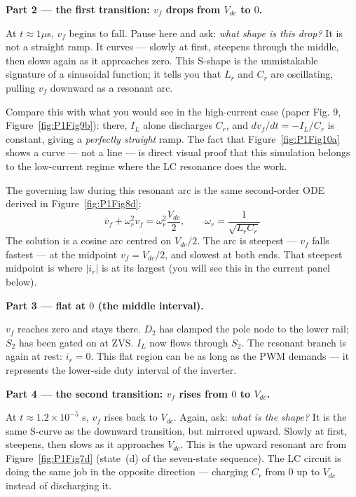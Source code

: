 \documentclass[12pt, a4paper]{article}
\def\,{ }%
\newcommand{\Vdc}{V_{dc}}
\newcommand{\vf}{v_f}
\newcommand{\ir}{i_r}
\newcommand{\IL}{I_L}
\newcommand{\Lr}{L_r}
\newcommand{\Cr}{C_r}
\newcommand{\omegar}{\omega_r}
\newcommand{\figref}[1]{Figure~\ref{#1}}
\begin{document}
\medskip
\textbf{Part 2 --- the first transition: $\vf$ drops from $\Vdc$ to $0$.}

At $t \approx 1\,\mu$s, $\vf$ begins to fall.
Pause here and ask: \emph{what shape is this drop?}
It is not a straight ramp.
It curves --- slowly at first, steepens through the middle, then slows again
as it approaches zero.
This S-shape is the unmistakable signature of a sinusoidal function; it
tells you that $\Lr$ and $\Cr$ are oscillating, pulling $\vf$ downward
as a resonant arc.

Compare this with what you would see in the high-current case (paper
Fig.\,9, \figref{fig:P1Fig9b}): there, $I_L$ alone discharges $C_r$, and
$d\vf/dt = -\IL/C_r$ is constant, giving a \emph{perfectly straight} ramp.
The fact that \figref{fig:P1Fig10a} shows a curve --- not a line --- is
direct visual proof that this simulation belongs to the low-current regime
where the LC resonance does the work.

The governing law during this resonant arc is the same second-order ODE
derived in \figref{fig:P1Fig8d}:
\begin{equation}
    \ddot{\vf} + \omegar^2\,\vf = \omegar^2\,\frac{\Vdc}{2},
    \qquad \omegar = \frac{1}{\sqrt{\Lr\Cr}}
    \label{eq:swing_ODE_Fig10}
\end{equation}
The solution is a cosine arc centred on $\Vdc/2$.
The arc is steepest --- $\vf$ falls fastest --- at the midpoint
$\vf = \Vdc/2$, and slowest at both ends.
That steepest midpoint is where $|\ir|$ is at its largest (you will see
this in the current panel below).

\medskip
\textbf{Part 3 --- flat at $0$ (the middle interval).}

$\vf$ reaches zero and stays there.
$D_2$ has clamped the pole node to the lower rail; $S_2$ has been gated on
at ZVS.
$\IL$ now flows through $S_2$.
The resonant branch is again at rest: $\ir = 0$.
This flat region can be as long as the PWM demands --- it represents the
lower-side duty interval of the inverter.

\medskip
\textbf{Part 4 --- the second transition: $\vf$ rises from $0$ to $\Vdc$.}

At $t \approx 1.2 \times 10^{-5}$\,s, $\vf$ rises back to $\Vdc$.
Again, ask: \emph{what is the shape?}
It is the same S-curve as the downward transition, but mirrored upward.
Slowly at first, steepens, then slows as it approaches $\Vdc$.
This is the upward resonant arc from \figref{fig:P1Fig7d} (state~(d) of
the seven-state sequence).
The LC circuit is doing the same job in the opposite direction --- charging
$C_r$ from 0 up to $\Vdc$ instead of discharging it.
\end{document}
